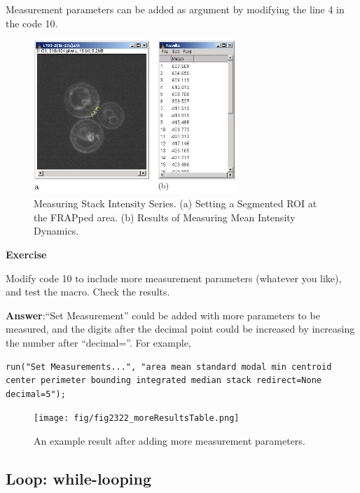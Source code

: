 \documentclass[11pt,a4paper,oneside]{report}
\newenvironment{indentexercise}[1]
{{\setlength{\leftmargin}{2em}}
\textbf{Exercise \thesubsection-#1}
\begin{list}{}
	\item
}
{\end{list}}
\begin{document}
Measurement parameters can be added as argument by modifying the line 4 in the code 10.

\begin{figure}[htbp]
\centering
\includegraphics[width=3in]{ijmacrofig-frapresults.pdf}

 \caption{Measuring Stack Intensity Series. (a) Setting a Segmented ROI at the FRAPped area. (b) Results of Measuring Mean Intensity Dynamics.}

 \label{fig:frapresults}
\end{figure}

\begin{indentexercise}{1}
Modify code 10 to include more measurement parameters (whatever you like), and test the macro. Check the results. 

\item \textbf{Answer}:``Set Measurement'' could be added with more parameters to be measured, and the digits after the decimal point could be increased by increasing the number after ``decimal=''. For example, 
\begin{lstlisting}[numbers=none]
run("Set Measurements...", "area mean standard modal min centroid center perimeter bounding integrated median stack redirect=None decimal=5");
\end{lstlisting}

\end{indentexercise}

\begin{figure}[htbp]
\begin{center}
\texttt{[image: fig/fig2322\_moreResultsTable.png]}
\caption{An example result after adding more measurement parameters.}
\label{fig_MoreMeasurementPara}
\end{center}
\end{figure} 


\subsection{Loop: while-looping}
\end{document}
